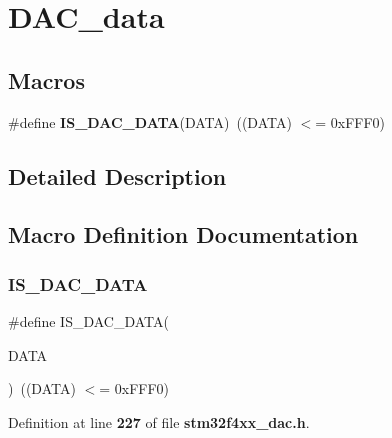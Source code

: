 \section{D\+A\+C\+\_\+data}
\label{group__DAC__data}
\subsection*{Macros}
\begin{DoxyCompactItemize}
\item 
\#define \textbf{ I\+S\+\_\+\+D\+A\+C\+\_\+\+D\+A\+TA}(D\+A\+TA)~((D\+A\+TA) $<$= 0x\+F\+F\+F0)
\end{DoxyCompactItemize}


\subsection{Detailed Description}


\subsection{Macro Definition Documentation}
\mbox{\label{group__DAC__data_ga903e28d4971e172b37c1c2fc17c2a884}} 
\subsubsection{I\+S\+\_\+\+D\+A\+C\+\_\+\+D\+A\+TA}
{\footnotesize\ttfamily \#define I\+S\+\_\+\+D\+A\+C\+\_\+\+D\+A\+TA(\begin{DoxyParamCaption}\item[{}]{D\+A\+TA }\end{DoxyParamCaption})~((D\+A\+TA) $<$= 0x\+F\+F\+F0)}



Definition at line \textbf{ 227} of file \textbf{ stm32f4xx\+\_\+dac.\+h}.

